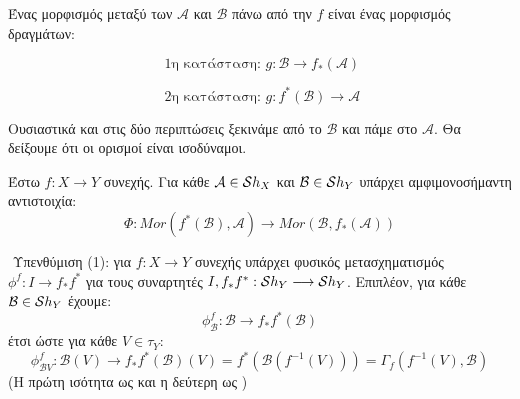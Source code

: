 \begin{defn} Ένας μορφισμός μεταξύ των $\mathcal A$ και $\mathcal B$ πάνω από την $f$ είναι ένας μορφισμός δραγμάτων:
    
    $$\text{ 1η κατάσταση: } g : \mathcal{B} \longrightarrow f_*(\mathcal{A})$$
    \begin{figure}[H]
        \centering
    \end{figure}

    
    $$\text{ 2η κατάσταση: } g: f^*(\mathcal B)\longrightarrow \mathcal A$$

    \begin{figure}[H]
        \centering
    \end{figure}
\end{defn}
\noindent Ουσιαστικά και στις δύο περιπτώσεις ξεκινάμε από το $\mathcal B$ και πάμε στο $\mathcal{A}$. Θα δείξουμε ότι οι ορισμοί είναι ισοδύναμοι.

\begin{theorem} Έστω $f:X\longrightarrow Y$ συνεχής. Για κάθε $\mathcal{A} \in \mathcal{S} h_X$ και $\mathcal B \in \mathcal{S} h_Y$ υπάρχει αμφιμονοσήμαντη αντιστοιχία:
    $$\Phi: Mor(f^*(\mathcal{B}),\mathcal{A}) \longrightarrow Mor(\mathcal{B},f_*(\mathcal{A}))$$
\end{theorem}

$ $\newline
Υπενθύμιση (1): για $f:X\longrightarrow Y$ συνεχής υπάρχει φυσικός μετασχηματισμός $\phi^f : I\longrightarrow f_*f^*$ για τους συναρτητές $I,f_*f^* : \mathcal{S} h_Y\longrightarrow \mathcal{S} h_Y$. Επιπλέον, για κάθε $\mathcal B \in \mathcal{S} h_Y$ έχουμε:
$$\phi^f_{\mathcal B} : \mathcal{B} \longrightarrow f_*f^*(\mathcal{B})$$ έτσι ώστε για κάθε $V\in \tau_Y$:
$$\phi^f_{\mathcal{B}V} : \mathcal{B}(V) \longrightarrow f_*f^*(\mathcal{B})(V) = f^*(\mathcal{B}(f^{-1}(V))) = \Gamma_f(f^{-1}(V),\mathcal{B})$$ (Η πρώτη ισότητα ως  και η δεύτερη ως )

